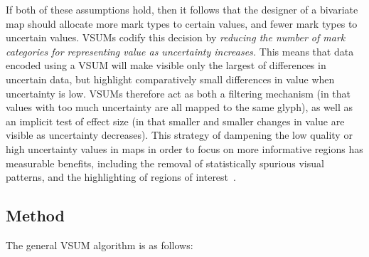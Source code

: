 \documentclass{vgtc}                          %
\begin{document}
If both of these assumptions hold, then it follows that the designer of a bivariate map should allocate more mark types to certain values, and fewer mark types to uncertain values. VSUMs codify this decision by \emph{reducing the number of mark categories for representing value as uncertainty increases.} This means that data encoded using a VSUM will make visible only the largest of differences in uncertain data, but highlight comparatively small differences in value when uncertainty is low. VSUMs therefore act as both a filtering mechanism (in that values with too much uncertainty are all mapped to the same glyph), as well as an implicit test of effect size (in that smaller and smaller changes in value are visible as uncertainty decreases). This strategy of dampening the low quality or high uncertainty values in maps in order to focus on more informative regions has measurable benefits, including the removal of statistically spurious visual patterns, and the highlighting of regions of interest~\cite{correll2017surprise}.

\subsection{Method}

\flowFig

The general VSUM algorithm is as follows:
\end{document}
